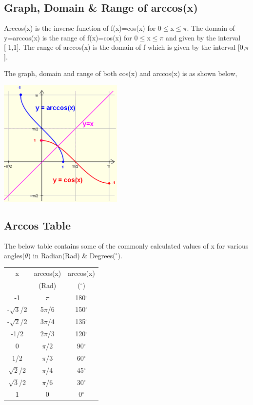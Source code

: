 \documentclass[12pt]{report}
\begin{document}
	\subsection{Graph, Domain \& Range of arccos(x)}

		Arccos(x) is the inverse function of f(x)=cos(x) for 0$\leq$x$\leq$$\pi$. The domain of y=arccos(x) is the range of f(x)=cos(x) for 0$\leq$x$\leq$$\pi$ and given by the interval [-1,1]. The range of arccos(x) is the domain of f which is given by the interval [0,$\pi$].\par
		The graph, domain and range of both cos(x) and arccos(x) is as shown below,
		\begin{center}
			\includegraphics[width=0.35\columnwidth]{pic2.png}
		\end{center}
\pagebreak	
	\subsection{Arccos Table}
The below table contains some of the commonly calculated values of	x for various angles($\theta$) in Radian(Rad) \& Degrees($^{\circ}$).
	\begin{center}
		\begin{tabular}{|c|c|c|}
			\hline
			x&arccos(x)&arccos(x)\\
			 &(Rad)&($^{\circ}$)\\
			 \hline
			 -1&$\pi$&180$^{\circ}$\\
			 \hline
			 -$\sqrt{3}$/2&5$\pi$/6&150$^{\circ}$\\
			 \hline
			 -$\sqrt{2}$/2&3$\pi$/4&135$^{\circ}$\\
			 \hline
			 -1/2&2$\pi$/3&120$^{\circ}$\\
			 \hline
			 0&$\pi$/2&90$^{\circ}$\\
			 \hline
			1/2&$\pi$/3&60$^{\circ}$\\
			 \hline
			 $\sqrt{2}$/2&$\pi$/4&45$^{\circ}$\\
			 \hline
			 $\sqrt{3}$/2&$\pi$/6&30$^{\circ}$\\
			 \hline
			 1&0&0$^{\circ}$\\
			 \hline
		\end{tabular}
	\end{center}
	
\end{document}
